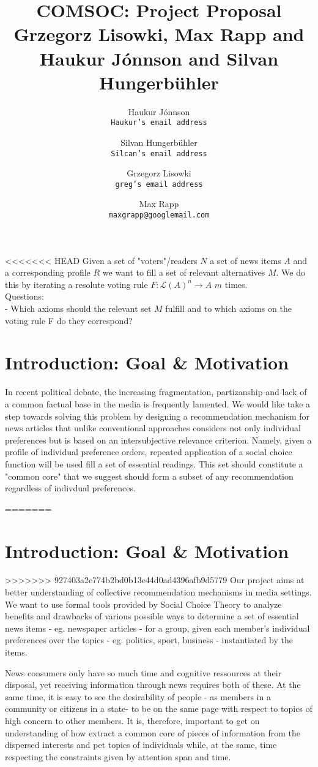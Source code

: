 \documentclass[10pt,a4paper,english]{article}
\author{
    Haukur J{\'o}nnson\\    \texttt{Haukur's email address}
    \and
    Silvan Hungerb{\"u}hler\\   \texttt{Silcan's email address}
    \and
    Grzegorz Lisowki\\  \texttt{greg's email address}
    \and
    Max Rapp\\  \texttt{maxgrapp@googlemail.com}

}
\title{%
  COMSOC: Project Proposal \\
  \small Grzegorz Lisowki, Max Rapp and Haukur J{\'o}nnson and Silvan Hungerb{\"u}hler }
\date{}
\begin{document}
\maketitle
<<<<<<< HEAD
Given a set of "voters"/readers $N$ a set of news items $A$ and a corresponding profile $R$ we want to fill a set of relevant alternatives $M$. We do this by iterating a resolute voting rule $F:\mathcal{L}(A)^n \rightarrow A$ $m$ times.\\

Questions:\\
- Which axioms should the relevant set $M$ fulfill and to which axioms on the voting rule F do they correspond?
\section*{Introduction: Goal \& Motivation}

In recent political debate, the increasing fragmentation, partizanship and lack of a common factual base in the media is frequently lamented. We would like take a step towards solving this problem by designing a recommendation mechanism for news articles that unlike conventional approaches considers not only individual preferences but is based on an intersubjective relevance criterion. Namely, given a profile of individual preference orders, repeated application of a social choice function will be used fill a set of essential readings. This set should constitute a "common core" that we suggest should form a subset of any recommendation regardless of indivdual preferences.

=======
\section{Introduction: Goal \& Motivation}
>>>>>>> 927403a2e774b2bd0b13e44d0ad4396afb9d5779
Our project aims at better understanding of collective recommendation mechanisms in media settings. We want to use formal tools provided by Social Choice Theory to analyze benefits and drawbacks of various possible ways to determine a set of essential news items - eg. newspaper articles - for a group, given each member's individual preferences over the topics - eg. politics, sport, business - instantiated by the items.

News consumers only have so much time and cognitive ressources at their disposal, yet receiving information through news requires both of these. At the same time, it is easy to see the desirability of people - as members in a community or citizens in a state- to be on the same page with respect to topics of high concern to other members. It is, therefore, important to get on understanding of how extract a common core of pieces of information from the dispersed interests and pet topics of individuals while, at the same, time respecting the constraints given by attention span and time.
\end{document}
